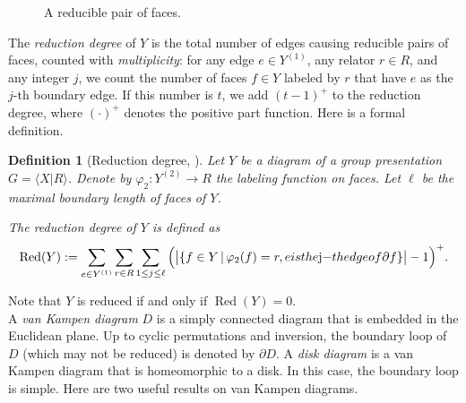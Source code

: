 \documentclass[a4paper]{article}
\DeclareMathOperator{\Red}{Red}
\newtheorem{defi}[thm]{Definition}
\theoremstyle{remark}
\begin{document}
\begin{figure}[h]
    \centering
    \caption{A reducible pair of faces.}
    \label{reducible faces}
\end{figure}

The \textit{reduction degree} of $Y$ is the total number of edges causing reducible pairs of faces, counted with \textit{multiplicity}: for any edge $e\in Y^{(1)}$, any relator $r\in R$, and any integer $j$, we count the number of faces $f\in Y$ labeled by $r$ that have $e$ as the $j$-th boundary edge. If this number is $t$, we add $(t-1)^+$ to the reduction degree, where $(\cdot)^+$ denotes the positive part function. Here is a formal definition.

\begin{defi}[Reduction degree, {\cite[Definition 2.5]{GM18}}]\label{reduction degree}
    Let $Y$  be a diagram of a group presentation $G = \langle X|R\rangle$. Denote by $\varphi_2: Y^{(2)}\to R$ the labeling function on faces. Let $\ell$ be the maximal boundary length of faces of $Y$. 

    The \textup{reduction degree} of $Y$ is defined as
    \[\Red(Y) := \sum_{e\in Y^{(1)}}\sum_{r\in R}\sum_{1\leq j\leq \ell}\Big(\big|\{f\in Y \,|\, \varphi_2(f) = r, e \textup{ is the $j$-th edge of } \partial f\}\big| - 1 \Big)^+.\]
\end{defi}

Note that $Y$ is reduced if and only if $\Red(Y) = 0$.\\

A \textit{van Kampen diagram} $D$ is a simply connected diagram that is embedded in the Euclidean plane. Up to cyclic permutations and inversion, the boundary loop of $D$ (which may not be reduced) is denoted by $\partial D$. A \textit{disk diagram} is a van Kampen diagram that is homeomorphic to a disk. In this case, the boundary loop is simple. Here are two useful results on van Kampen diagrams.
\end{document}
